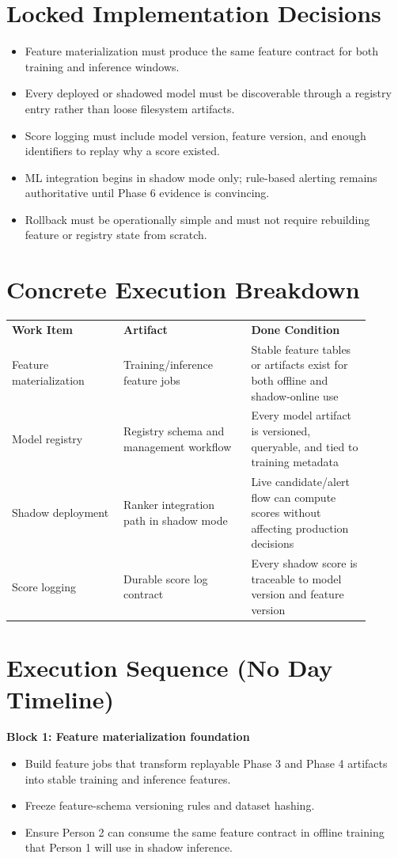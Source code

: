 \documentclass{article}
\begin{document}
\section*{Locked Implementation Decisions}
\begin{itemize}
\item Feature materialization must produce the same feature contract for both training and inference windows.
\item Every deployed or shadowed model must be discoverable through a registry entry rather than loose filesystem artifacts.
\item Score logging must include model version, feature version, and enough identifiers to replay why a score existed.
\item ML integration begins in shadow mode only; rule-based alerting remains authoritative until Phase 6 evidence is convincing.
\item Rollback must be operationally simple and must not require rebuilding feature or registry state from scratch.
\end{itemize}

\section*{Concrete Execution Breakdown}
\begin{longtable}{p{0.28\linewidth}p{0.32\linewidth}p{0.30\linewidth}}
\textbf{Work Item} & \textbf{Artifact} & \textbf{Done Condition} \\
Feature materialization & Training/inference feature jobs & Stable feature tables or artifacts exist for both offline and shadow-online use \\
Model registry & Registry schema and management workflow & Every model artifact is versioned, queryable, and tied to training metadata \\
Shadow deployment & Ranker integration path in shadow mode & Live candidate/alert flow can compute scores without affecting production decisions \\
Score logging & Durable score log contract & Every shadow score is traceable to model version and feature version \\
\end{longtable}

\section*{Execution Sequence (No Day Timeline)}
\textbf{Block 1: Feature materialization foundation}
\begin{itemize}
\item Build feature jobs that transform replayable Phase 3 and Phase 4 artifacts into stable training and inference features.
\item Freeze feature-schema versioning rules and dataset hashing.
\item Ensure Person 2 can consume the same feature contract in offline training that Person 1 will use in shadow inference.
\end{itemize}
\end{document}
